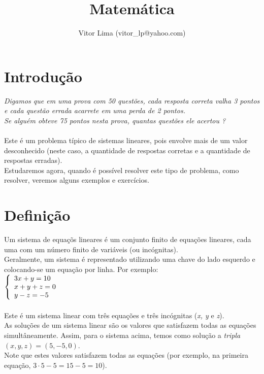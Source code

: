 \documentclass[a4paper,12pt]{article}
\begin{document}

\title{Matemática}
\author{Vitor Lima (vitor\_lp@yahoo.com)}

\maketitle


\section{Introdução}
    \emph{Digamos que em uma prova com 50 questões, cada resposta correta valha 3 pontos e cada questão errada acarrete em uma perda de 2 pontos. \\
    Se alguém obteve 75 pontos nesta prova, quantas questões ele acertou ?} \\ \\
    Este é um problema típico de sistemas lineares, pois envolve mais de um valor desconhecido (neste caso, a quantidade de respostas corretas e a quantidade de respostas erradas). \\
    Estudaremos agora, quando é possível resolver este tipo de problema, como resolver, veremos alguns exemplos e exercícios.



\section{Definição}
    Um sistema de equaçõs lineares é um conjunto finito de equações lineares, cada uma com um número finito de variáveis (ou incógnitas). \\
    Geralmente, um sistema é representado utilizando uma chave do lado esquerdo e colocando-se um equação por linha. Por exemplo:\\
    
$ 
\left\{
\begin{array}{ll}
\displaystyle 3x + y  = 10 \\
\displaystyle x + y + z = 0 \\
\displaystyle y - z = -5
\end{array}
\right.\\
$
   \\  \\ Este é um sistema linear com três equações e três incógnitas (\emph{x, y} e \emph{z}). \\
    As soluções de um sistema linear são os valores que satisfazem todas as equações simultâneamente. Assim, para o sistema acima, temos como solução a \emph{tripla} $(x, y, z) = (5, -5, 0)$.\\
    Note que estes valores satisfazem todas as equações (por exemplo, na primeira equação, $3\cdot5 - 5 = 15 - 5 = 10$).
\end{document}
